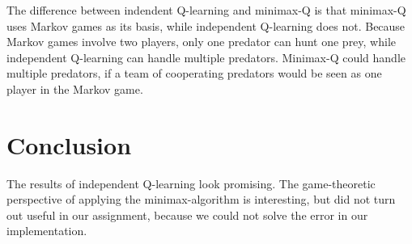 \documentclass{article}
\begin{document}
The difference between indendent Q-learning and minimax-Q is that minimax-Q uses Markov games as its basis, while independent Q-learning does not. Because Markov games involve two players, only one predator can hunt one prey, while independent Q-learning can handle multiple predators. Minimax-Q could handle multiple predators, if a team of cooperating predators would be seen as one player in the Markov game.
\section{Conclusion}
The results of independent Q-learning look promising. The game-theoretic perspective of applying the minimax-algorithm is interesting, but did not turn out useful in our assignment, because we could not solve the error in our implementation.
\end{document}
